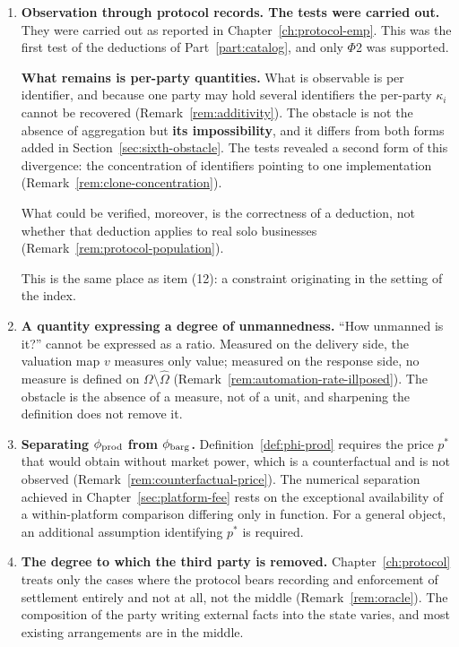 \begin{enumerate}[label=(\arabic*),start=9]
\item \textbf{Observation through protocol records. The tests were carried out.}
They were carried out as reported in Chapter~\ref{ch:protocol-emp}. This was the first test of
the deductions of Part~\ref{part:catalog}, and only $\Phi$2 was supported.

\textbf{What remains is per-party quantities.} What is observable is per identifier, and
because one party may hold several identifiers the per-party $\kappa_i$ cannot be recovered
(Remark~\ref{rem:additivity}). The obstacle is not the absence of aggregation but
\textbf{its impossibility}, and it differs from both forms added in
Section~\ref{sec:sixth-obstacle}. The tests revealed a second form of this divergence: the
concentration of identifiers pointing to one implementation
(Remark~\ref{rem:clone-concentration}).

What could be verified, moreover, is the correctness of a deduction, not whether that
deduction applies to real solo businesses (Remark~\ref{rem:protocol-population}).

This is the same place as item (12): a constraint originating in the setting of the index.

\item \textbf{A quantity expressing a degree of unmannedness.}
``How unmanned is it?'' cannot be expressed as a ratio. Measured on the delivery side, the
valuation map $v$ measures only value; measured on the response side, no measure is defined
on $\Omega\setminus\hat\Omega$ (Remark~\ref{rem:automation-rate-illposed}). The obstacle is
the absence of a measure, not of a unit, and sharpening the definition does not remove it.

\item \textbf{Separating $\phi_{\rm prod}$ from $\phi_{\rm barg}$.}
Definition~\ref{def:phi-prod} requires the price $p^{\ast}$ that would obtain without market
power, which is a counterfactual and is not observed
(Remark~\ref{rem:counterfactual-price}). The numerical separation achieved in
Chapter~\ref{sec:platform-fee} rests on the exceptional availability of a within-platform
comparison differing only in function. For a general object, an additional assumption
identifying $p^{\ast}$ is required.

\item \textbf{The degree to which the third party is removed.}
Chapter~\ref{ch:protocol} treats only the cases where the protocol bears recording and
enforcement of settlement entirely and not at all, not the middle
(Remark~\ref{rem:oracle}). The composition of the party writing external facts into the state
varies, and most existing arrangements are in the middle.
\end{enumerate}

